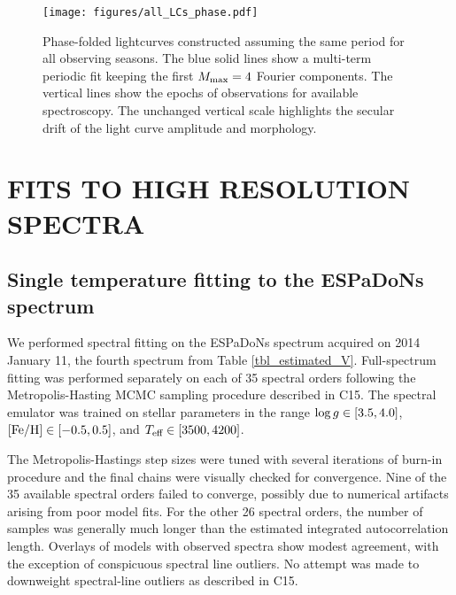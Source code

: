 \documentclass[twocolumn]{emulateapj}%
\newcommand{\iancze}{{\sc C15}}
\begin{document}
\begin{figure*}
	\centering
	\texttt{[image: figures/all\_LCs\_phase.pdf]}
	\caption{Phase-folded lightcurves constructed assuming the same period for all observing seasons.  The blue solid lines show a multi-term periodic fit keeping the first $M_{\rm max}=4$ Fourier components.  The vertical lines show the epochs of observations for available spectroscopy.  The unchanged vertical scale highlights the secular drift of the light curve amplitude and morphology.}
	\label{fig:PhotPhase}
\end{figure*}





\section{FITS TO HIGH RESOLUTION SPECTRA}



\subsection{Single temperature fitting to the ESPaDoNs spectrum}

We performed spectral fitting on the ESPaDoNs spectrum acquired on 2014 January 11, the fourth spectrum from Table \ref{tbl_estimated_V}.  Full-spectrum fitting was performed separately on each of 35 spectral orders following the Metropolis-Hasting MCMC sampling procedure described in \iancze.  The spectral emulator was trained on stellar parameters in the range $\log g \in [3.5, 4.0]$, $[{\rm Fe}/{\rm H}] \in [-0.5, 0.5]$, and $T_\textrm{eff} \in [3500, 4200]$.

The Metropolis-Hastings step sizes were tuned with several iterations of burn-in procedure and the final chains were visually checked for convergence.  Nine of the 35 available spectral orders failed to converge, possibly due to numerical artifacts arising from poor model fits.  For the other 26 spectral orders, the number of samples was generally much longer than the estimated integrated autocorrelation length.  Overlays of models with observed spectra show modest agreement, with the exception of conspicuous spectral line outliers.  No attempt was made to downweight spectral-line outliers as described in \iancze.  
\end{document}
